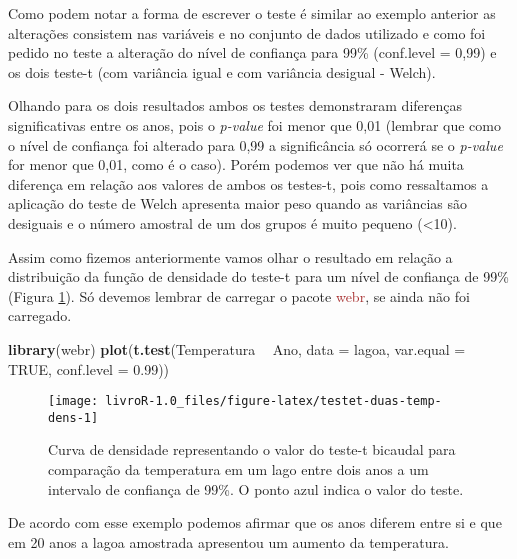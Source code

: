 \documentclass[14pt,titlepage, oneside, openany, a4paper]{book}
\newenvironment{Shaded}{\begin{snugshade}}{\end{snugshade}}
\newcommand{\DataTypeTok}[1]{\textcolor[rgb]{0.13,0.29,0.53}{#1}}
\newcommand{\FloatTok}[1]{\textcolor[rgb]{0.00,0.00,0.81}{#1}}
\newcommand{\KeywordTok}[1]{\textcolor[rgb]{0.13,0.29,0.53}{\textbf{#1}}}
\newcommand{\NormalTok}[1]{#1}
\newcommand{\OperatorTok}[1]{\textcolor[rgb]{0.81,0.36,0.00}{\textbf{#1}}}
\newcommand{\OtherTok}[1]{\textcolor[rgb]{0.56,0.35,0.01}{#1}}
\newcommand{\StringTok}[1]{\textcolor[rgb]{0.31,0.60,0.02}{#1}}
\begin{document}
Como podem notar a forma de escrever o teste é similar ao exemplo anterior as alterações consistem nas variáveis e no conjunto de dados utilizado e como foi pedido no teste a alteração do nível de confiança para 99\% (conf.level = 0,99) e os dois teste-t (com variância igual e com variância desigual - Welch).

Olhando para os dois resultados ambos os testes demonstraram diferenças significativas entre os anos, pois o \emph{p-value} foi menor que 0,01 (lembrar que como o nível de confiança foi alterado para 0,99 a significância só ocorrerá se o \emph{p-value} for menor que 0,01, como é o caso). Porém podemos ver que não há muita diferença em relação aos valores de ambos os testes-t, pois como ressaltamos a aplicação do teste de Welch apresenta maior peso quando as variâncias são desiguais e o número amostral de um dos grupos é muito pequeno (\textless{}10).

Assim como fizemos anteriormente vamos olhar o resultado em relação a distribuição da função de densidade do teste-t para um nível de confiança de 99\% (Figura \ref{fig:testet-duas-temp-dens}). Só devemos lembrar de carregar o pacote \textcolor{brown}{webr}, se ainda não foi carregado.

\begin{Shaded}
\begin{Highlighting}[]
\KeywordTok{library}\NormalTok{(webr)}
\KeywordTok{plot}\NormalTok{(}\KeywordTok{t.test}\NormalTok{(Temperatura }\OperatorTok{~}\StringTok{ }\NormalTok{Ano, }
            \DataTypeTok{data =}\NormalTok{ lagoa,}
            \DataTypeTok{var.equal =} \OtherTok{TRUE}\NormalTok{,}
            \DataTypeTok{conf.level =} \FloatTok{0.99}\NormalTok{))}
\end{Highlighting}
\end{Shaded}

\begin{figure}[H]

{\centering \texttt{[image: livroR-1.0\_files/figure-latex/testet-duas-temp-dens-1]} 

}

\caption{Curva de densidade representando o valor do teste-t bicaudal para comparação da temperatura em um lago entre dois anos a um intervalo de confiança de 99\%. O ponto azul indica o valor do teste.}\label{fig:testet-duas-temp-dens}
\end{figure}

De acordo com esse exemplo podemos afirmar que os anos diferem entre si e que em 20 anos a lagoa amostrada apresentou um aumento da temperatura.
\end{document}
